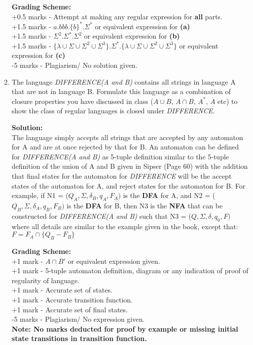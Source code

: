 \documentclass[11pt, article, oneside]{memoir}
\begin{document}
\begin{enumerate}
        \textbf{Grading Scheme:}
        \\+0.5 marks - Attempt at making any regular expression for \textbf{all} parts.
        \\+1.5 marks - \(a.bbb.\{b\}^*.\Sigma^*\) or equivalent expression for \textbf{(a)}
        \\+1.5 marks - \(\Sigma^2.\Sigma^*.\Sigma^2\) or equivalent expression for \textbf{(b)}
        \\+1.5 marks - \(\{\lambda \cup \Sigma \cup \Sigma^2 \cup \Sigma^3\}.\Sigma^*.\{\lambda \cup \Sigma \cup \Sigma^2 \cup \Sigma^3\}\) or equivalent expression for \textbf{(c)}
        \\-5 marks -  Plagiarism/ No solution given.
    \item
        The language \textit{DIFFERENCE(A and B)} contains all strings in language A that are not in language B. Formulate this language as a combination of closure properties you have discussed in class ($A \cup B$, $A \cap B$, $A^*$, $\overline{A}$ etc) to show the class of regular languages is closed under \textit{DIFFERENCE}.
                
        \textbf{Solution:}
        \\The language simply accepts all strings that are accepted by any automaton for A and are at once rejected by that for B. An automaton can be defined  for \textit{DIFFERENCE(A and B)} as 5-tuple definition similar to the 5-tuple definition of the union of A and B given in Sipser (Page 60) with the addition that final states for the automaton for \textit{DIFFERENCE} will be the accept states of the automaton for A, and reject states for the automaton for B. For example, if N1 = (\(Q_A, \Sigma, \delta_B, q_A, F_A)\) is the \textbf{DFA} for A, and N2 = (\(Q_B, \Sigma, \delta_A, q_B, F_B)\) is the \textbf{DFA} for B, then N3 is the \textbf{NFA} that can be constructed for \textit{DIFFERENCE(A and B)} such that N3 = (\(Q, \Sigma, \delta, q_0, F)\) where all details are similar to the example given in the book, except that: \( F = F_A \cap \{Q_B - F_B\} \)

        \textbf{Grading Scheme:}
        \\+1 mark - \(A \cap B'\) or equivalent expression given.
        \\+1 mark - 5-tuple automaton definition, diagram or any indication of proof of regularity of language.
        \\+1 mark - Accurate set of states.
        \\+1 mark - Accurate transition function.
        \\+1 mark - Accurate set of final states.
        \\-5 marks -  Plagiarism/ No expression given.
        \\\textbf{Note: No marks deducted for proof by example or missing initial state transitions in transition function.}
        
\end{enumerate}
\end{document}
